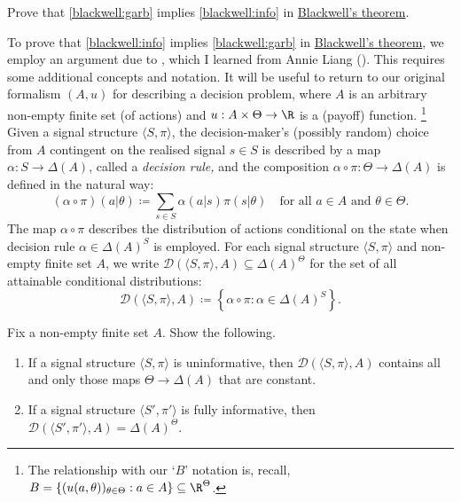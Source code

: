 \begin{exercise}
	\label{exercise:blackwell_easy}
	Prove that \ref{blackwell:garb} implies \ref{blackwell:info} in \hyperref[theorem:blackwell]{Blackwell's theorem}. 
\end{exercise}

To prove that \ref{blackwell:info} implies \ref{blackwell:garb} in {\hyperref[theorem:blackwell]{Blackwell's theorem}}, we employ an argument due to \textcite{Deoliveira2018}, which I learned from Annie Liang (\citeyear{Liang2023}). This requires some additional concepts and notation. It will be useful to return to our original formalism $(A,u)$ for describing a decision problem, where $A$ is an arbitrary non-empty finite set (of actions) and $u : A \times \Theta \to \R$ is a (payoff) function.%
	\footnote{The relationship with our `$B$' notation is, recall, $B = \{ (u(a,\theta))_{\theta \in \Theta} : a \in A \} \subseteq \R^\Theta$.}
Given a signal structure $\langle S, \pi \rangle $, the decision-maker's (possibly random) choice from $A$ contingent on the realised signal $s \in S$ is described by a map $\alpha : S \to \Delta(A)$, called a \emph{decision rule,} and the composition $\alpha \circ \pi : \Theta \to \Delta(A)$ is defined in the natural way:
%
\begin{equation*}
	(\alpha \circ \pi)(a|\theta)
	\coloneqq \sum_{s \in S} \alpha(a|s) \pi(s|\theta)
	\quad \text{for all $a \in A$ and $\theta \in \Theta$.}
\end{equation*}
%
The map $\alpha \circ \pi$ describes the distribution of actions conditional on the state when decision rule $\alpha \in \Delta(A)^S$ is employed. For each signal structure $\langle S, \pi \rangle $ and non-empty finite set $A$, we write $\mathcal{D}(\langle S, \pi \rangle ,A) \subseteq \Delta(A)^\Theta$ for the set of all attainable conditional distributions:
%
\begin{equation*}
	\mathcal{D}(\langle S, \pi \rangle ,A)
	\coloneqq \left\{
	\alpha \circ \pi : \alpha \in \Delta(A)^S
	\right\} .
\end{equation*}

\begin{namedthm}[\Cref*{exercise:fullnoinfo} {\normalfont (continued).}]
	\label{exercise:fullnoinfo_feas}
	Fix a non-empty finite set $A$. Show the following.

	\begin{enumerate}[label=(\alph*),resume]

		\item If a signal structure $\langle S, \pi \rangle $ is uninformative, then $\mathcal{D}(\langle S, \pi \rangle ,A)$ contains all and only those maps $\Theta \to \Delta(A)$ that are constant.
	
		\item If a signal structure $\langle S', \pi' \rangle $ is fully informative, then $\mathcal{D}(\langle S', \pi' \rangle ,A) = \Delta(A)^\Theta$.
	
	\end{enumerate}
\end{namedthm}

